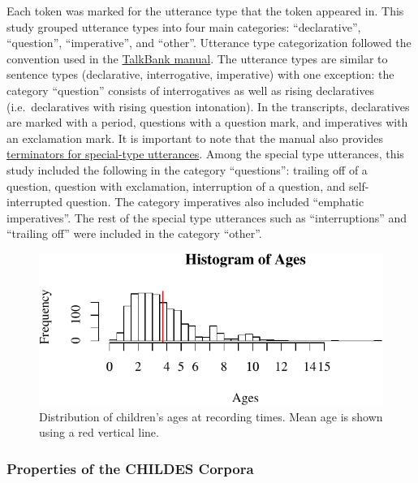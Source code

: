 \documentclass[floatsintext,man]{apa6}
\theoremstyle{definition}
\theoremstyle{definition}
\theoremstyle{definition}
\theoremstyle{remark}
\begin{document}
Each token was marked for the utterance type that the token appeared in.
This study grouped utterance types into four main categories:
\enquote{declarative}, \enquote{question}, \enquote{imperative}, and
\enquote{other}. Utterance type categorization followed the convention
used in the
\href{https://talkbank.org/manuals/CHAT.html\#_Toc486414422}{TalkBank
manual}. The utterance types are similar to sentence types (declarative,
interrogative, imperative) with one exception: the category
\enquote{question} consists of interrogatives as well as rising
declaratives (i.e.~declaratives with rising question intonation). In the
transcripts, declaratives are marked with a period, questions with a
question mark, and imperatives with an exclamation mark. It is important
to note that the manual also provides
\href{https://talkbank.org/manuals/CHAT.html\#_Toc486414431}{terminators
for special-type utterances}. Among the special type utterances, this
study included the following in the category \enquote{questions}:
trailing off of a question, question with exclamation, interruption of a
question, and self-interrupted question. The category imperatives also
included \enquote{emphatic imperatives}. The rest of the special type
utterances such as \enquote{interruptions} and \enquote{trailing off}
were included in the category \enquote{other}.

\begin{figure}
\centering
\includegraphics{figs/ageDistPlot-1.pdf}
\caption{\label{fig:ageDistPlot}Distribution of children's ages at recording
times. Mean age is shown using a red vertical line.}
\end{figure}

\subsubsection{Properties of the CHILDES
Corpora}\label{properties-of-the-childes-corpora}
\end{document}
